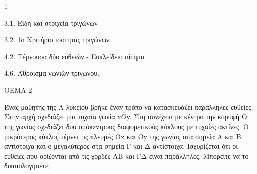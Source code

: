 \begin{ylh}{1}
    \item 3.1. Είδη και στοιχεία τριγώνων
    \item 3.2. 1ο Κριτήριο ισότητας τριγώνων
    \item 4.2. Τέμνουσα δύο ευθειών - Ευκλείδειο αίτημα
    \item 4.6. Άθροισμα γωνιών τριγώνου.
\end{ylh}

ΘΕΜΑ 2

Ένας μαθητής της Α\textquotesingle{} λυκείου βρήκε έναν τρόπο να κατασκευάζει παράλληλες ευθείες. Στην αρχή σχεδιάζει μια τυχαία γωνία x$\widehat{Ο}$y. Στη συνέχεια με κέντρο την κορυφή Ο της γωνίας σχεδιάζει δυο ομόκεντρους διαφορετικούς κύκλους με τυχαίες ακτίνες. Ο μικρότερος κύκλος τέμνει τις πλευρές Οx και Οy της γωνίας στα σημεία Α και Β αντίστοιχα και ο μεγαλύτερος στα σημεία Γ και Δ αντίστοιχα. Ισχυρίζεται ότι οι ευθείες που ορίζονται από τις χορδές ΑΒ και ΓΔ είναι παράλληλες. Μπορείτε να το δικαιολογήσετε; 

